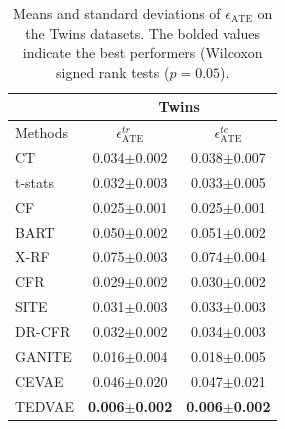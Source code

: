 \documentclass[letterpaper]{article} %
\begin{document}
\begin{table}[!t]
	\setlength{\tabcolsep}{4pt}
	\centering
	\begin{tabular}{l | c c}
		\hline
		&   \multicolumn{2}{c}{Twins} \\
		\hline
		Methods & $\epsilon_{\text{ATE}}^{tr}$ &  $\epsilon_{\text{ATE}}^{te}$  \\
		\hline
		CT &   0.034$\pm$0.002 & 0.038$\pm$0.007  \\
		t-stats & 0.032$\pm$0.003 & 0.033$\pm$0.005\\
		\hline
		CF	 & 0.025$\pm$0.001 & 0.025$\pm$0.001 \\
		BART  & 0.050$\pm$0.002 & 0.051$\pm$0.002\\
		X-RF   & 0.075$\pm$0.003 & 0.074$\pm$0.004 \\
		\hline
		CFR	    & 0.029$\pm$0.002 & 0.030$\pm$0.002\\

		SITE  & 0.031$\pm$0.003 & 0.033$\pm$0.003 \\
		DR-CFR & 0.032$\pm$0.002 & 0.034$\pm$0.003 \\
		\hline
		GANITE & 0.016$\pm$0.004 & 0.018$\pm$0.005 \\
		CEVAE   & 0.046$\pm$0.020 & 0.047$\pm$0.021 \\
		TEDVAE  & \textbf{0.006$\pm$0.002}  & \textbf{0.006$\pm$0.002} \\
		\hline
	\end{tabular}
	\label{ATE_results}
	\caption{ Means and standard deviations of $\epsilon_{\text{ATE}}$ on the Twins datasets. The bolded values indicate the best performers (Wilcoxon signed rank tests ($p=0.05$). }
\end{table}
\end{document}
